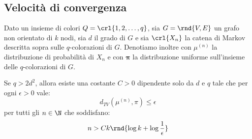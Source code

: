 \documentclass[\main/main.tex]{subfiles}
\begin{document}
\subsection{Velocità di convergenza}
\begin{theorem}
  Dato un insieme di colori \(Q = \crl{1, 2, \ldots, q}\), sia \(G = \rnd{V, E}\) un grafo non orientato di \(k\) nodi, sia \(d\) il grado di \(G\) e sia \(\crl{X_n}\) la catena di Markov descritta sopra sulle \(q\)-colorazioni di \(G\). Denotiamo inoltre con \(\mu^{(n)}\) la distribuzione di probabilità di \(X_n\) e con \(\bm{\pi} \) la distribuzione uniforme sull'insieme delle \(q\)-colorazioni di \(G\).

  Se \(q>2d^2\), allora esiste una costante \(C>0\) dipendente solo da \(d\) e \(q\) tale che per ogni \(\epsilon> 0\) vale:
  \[
    d_{TV}(\mu^{(n)}, \pi) \leq \epsilon
  \]
  per tutti gli \(n \in \N \) che soddisfano:
  \[
    n > Ck\rnd{\log k + \log \frac{1}{\epsilon}}
  \]
\end{theorem}
\end{document}
